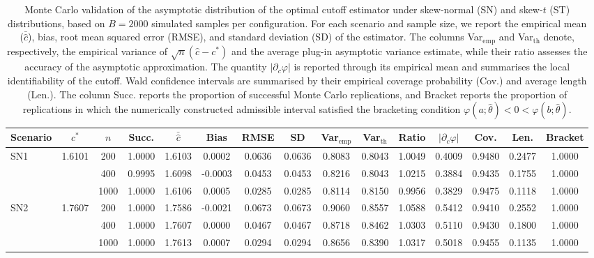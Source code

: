 \documentclass[11pt,a4paper]{article}
\theoremstyle{definition}
\theoremstyle{remark}
\newcommand{\1}{\mathbf{1}}
\begin{document}
\begin{table}[h!]
\centering
\caption{Monte Carlo validation of the asymptotic distribution of the optimal cutoff estimator under skew-normal (SN) and skew-$t$ (ST) distributions, based on $B=2000$ simulated samples per configuration. For each scenario and sample size, we report the empirical mean ($\bar{\hat{c}}$), bias, root mean squared error (RMSE), and standard deviation (SD) of the estimator. The columns Var$_{\mathrm{emp}}$ and Var$_{\mathrm{th}}$ denote, respectively, the empirical variance of $\sqrt{n}(\hat c-c^*)$ and the average plug-in asymptotic variance estimate, while their ratio assesses the accuracy of the asymptotic approximation. The quantity $|\partial_c\varphi|$ is reported through its empirical mean and summarises the local identifiability of the cutoff. Wald confidence intervals are summarised by their empirical coverage probability (Cov.) and average length (Len.). The column Succ. reports the proportion of successful Monte Carlo replications, and Bracket reports the proportion of replications in which the numerically constructed admissible interval satisfied the bracketing condition $\varphi(a;\hat\theta)<0<\varphi(b;\hat\theta)$.}
\label{tab:asymptotic_validation}

\scriptsize
\setlength{\tabcolsep}{3pt}
\renewcommand{\arraystretch}{0.9}

\begin{tabular*}{\textwidth}{@{\extracolsep\fill}lcccccccccccccc@{\extracolsep\fill}}
\toprule
\textbf{Scenario} & $c^*$ & $n$ & Succ. & $\bar{\hat{c}}$ & Bias & RMSE & SD & Var$_{\text{emp}}$ & Var$_{\text{th}}$ & Ratio & $|\partial_c \varphi|$ & Cov. & Len. & Bracket \\
\midrule

\multirow{3}{*}{SN1} & \multirow{3}{*}{1.6101}
& 200  & 1.0000 & 1.6103 &  0.0002 & 0.0636 & 0.0636 & 0.8083 & 0.8043 & 1.0049 & 0.4009 & 0.9480 & 0.2477 & 1.0000 \\
& & 400  & 0.9995 & 1.6098 & -0.0003 & 0.0453 & 0.0453 & 0.8216 & 0.8043 & 1.0215 & 0.3884 & 0.9435 & 0.1755 & 1.0000 \\
& & 1000 & 1.0000 & 1.6106 &  0.0005 & 0.0285 & 0.0285 & 0.8114 & 0.8150 & 0.9956 & 0.3829 & 0.9475 & 0.1118 & 1.0000 \\

\midrule

\multirow{3}{*}{SN2} & \multirow{3}{*}{1.7607}
& 200  & 1.0000 & 1.7586 & -0.0021 & 0.0673 & 0.0673 & 0.9060 & 0.8557 & 1.0588 & 0.5412 & 0.9410 & 0.2552 & 1.0000 \\
& & 400  & 1.0000 & 1.7607 &  0.0000 & 0.0467 & 0.0467 & 0.8718 & 0.8462 & 1.0303 & 0.5110 & 0.9430 & 0.1800 & 1.0000 \\
& & 1000 & 1.0000 & 1.7613 &  0.0007 & 0.0294 & 0.0294 & 0.8656 & 0.8390 & 1.0317 & 0.5018 & 0.9455 & 0.1135 & 1.0000 \\


\end{tabular*}
\end{table}
\end{document}
